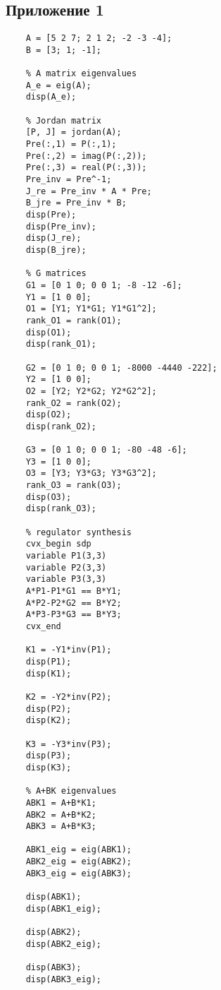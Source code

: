 \documentclass[a4paper, 12pt]{article}
\begin{document}
    \subsection{Приложение 1}
    \begin{lstlisting}[label=task1, caption={Программа для первого задания}]
    % input data
    A = [5 2 7; 2 1 2; -2 -3 -4];
    B = [3; 1; -1];

    % A matrix eigenvalues
    A_e = eig(A);
    disp(A_e);

    % Jordan matrix
    [P, J] = jordan(A);
    Pre(:,1) = P(:,1);
    Pre(:,2) = imag(P(:,2));
    Pre(:,3) = real(P(:,3));
    Pre_inv = Pre^-1; 
    J_re = Pre_inv * A * Pre;
    B_jre = Pre_inv * B;
    disp(Pre);
    disp(Pre_inv);
    disp(J_re);
    disp(B_jre);

    % G matrices
    G1 = [0 1 0; 0 0 1; -8 -12 -6];
    Y1 = [1 0 0];
    O1 = [Y1; Y1*G1; Y1*G1^2];
    rank_O1 = rank(O1);
    disp(O1);
    disp(rank_O1);

    G2 = [0 1 0; 0 0 1; -8000 -4440 -222];
    Y2 = [1 0 0];
    O2 = [Y2; Y2*G2; Y2*G2^2];
    rank_O2 = rank(O2);
    disp(O2);
    disp(rank_O2);

    G3 = [0 1 0; 0 0 1; -80 -48 -6];
    Y3 = [1 0 0];
    O3 = [Y3; Y3*G3; Y3*G3^2];
    rank_O3 = rank(O3);
    disp(O3);
    disp(rank_O3);

    % regulator synthesis
    cvx_begin sdp
    variable P1(3,3)
    variable P2(3,3)
    variable P3(3,3)
    A*P1-P1*G1 == B*Y1;
    A*P2-P2*G2 == B*Y2;
    A*P3-P3*G3 == B*Y3;
    cvx_end

    K1 = -Y1*inv(P1);
    disp(P1);
    disp(K1);

    K2 = -Y2*inv(P2);
    disp(P2);
    disp(K2);

    K3 = -Y3*inv(P3);
    disp(P3);
    disp(K3);

    % A+BK eigenvalues
    ABK1 = A+B*K1;
    ABK2 = A+B*K2;
    ABK3 = A+B*K3;

    ABK1_eig = eig(ABK1);
    ABK2_eig = eig(ABK2);
    ABK3_eig = eig(ABK3);

    disp(ABK1);
    disp(ABK1_eig);

    disp(ABK2);
    disp(ABK2_eig);

    disp(ABK3);
    disp(ABK3_eig);
    \end{lstlisting}
\end{document}
